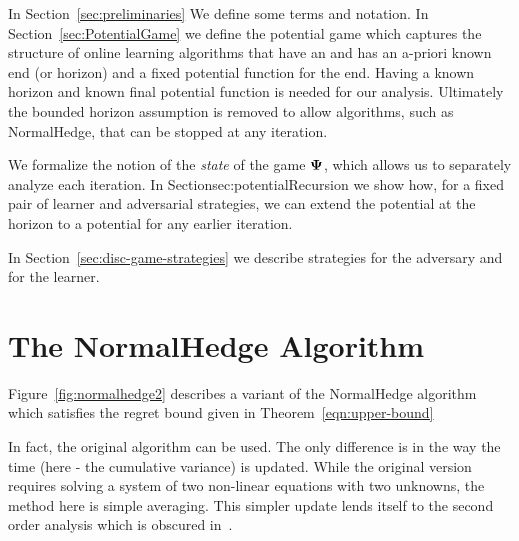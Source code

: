 \documentclass{article}[12pt]
\begin{document}
In Section~\ref{sec:preliminaries} We define some terms and
notation. In Section~\ref{sec:PotentialGame} we define the potential
game which captures the structure of online learning algorithms that
have an and has an a-priori known end (or horizon) and a fixed
potential function for the end.  Having a known horizon and known
final potential function is needed for our analysis. Ultimately the
bounded horizon assumption is removed to allow algorithms, such as
NormalHedge, that can be stopped at any iteration.

We formalize the notion of the {\em state} of the game ${\bf \Psi}$, which
allows us to separately analyze each iteration. In
Section{sec:potentialRecursion} we show how, for a fixed pair of
learner and adversarial strategies, we can extend the potential at the
horizon to a potential for any earlier iteration.

In Section~\ref{sec:disc-game-strategies} we describe strategies for the adversary and for the learner.

\section{The NormalHedge  Algorithm} \label{sec:NormalHedgeAlg}
Figure~\ref{fig:normalhedge2} describes a variant of the NormalHedge
algorithm~\cite{chaudhuri2009parameter} which satisfies the regret
bound given in Theorem~\ref{eqn:upper-bound}

In fact, the original algorithm can be used. The only difference is in
the way the time (here - the cumulative variance) is updated. While
the original version requires solving a system of two non-linear
equations with two unknowns, the method here is simple averaging.
This simpler update lends itself to the second order analysis which is
obscured in~\cite{chaudhuri2009parameter}.

\newcommand{\pospart}[1]{[#1]_{+}}
\end{document}

